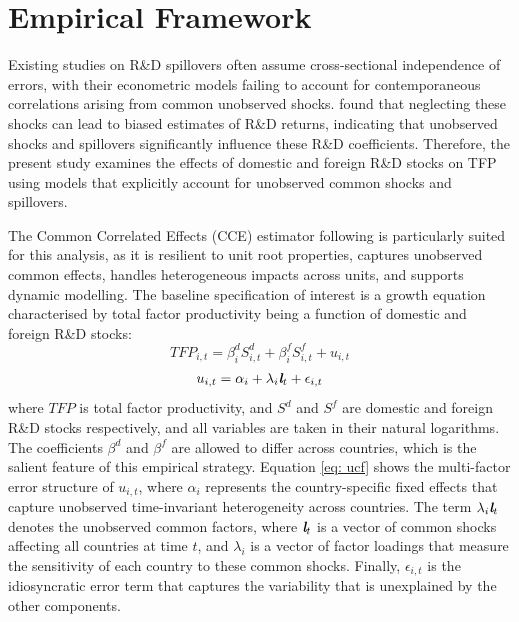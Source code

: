 \documentclass[12pt]{article}
\begin{document}
\section{Empirical Framework}

Existing studies on R\&D spillovers often assume cross-sectional independence of errors, with their econometric models failing to account for contemporaneous correlations arising from common unobserved shocks. \citet{Eberhardt2013} found that neglecting these shocks can lead to biased estimates of R\&D returns, indicating that unobserved shocks and spillovers significantly influence these R\&D coefficients. Therefore, the present study examines the effects of domestic and foreign R\&D stocks on TFP using models that explicitly account for unobserved common shocks and spillovers.

The Common Correlated Effects (CCE) estimator following \citet{Chudik2015} is particularly suited for this analysis, as it is resilient to unit root properties, captures unobserved common effects, handles heterogeneous impacts across units, and supports dynamic modelling. The baseline specification of interest is a growth equation characterised by total factor productivity being a function of domestic and foreign R\&D stocks:
\begin{equation}
TFP_{i,t}=\beta^d_i S_{i,t}^{d} + \beta^f_i S_{i,t}^{f} + u_{i,t}
\label{eq: ccemg}
\end{equation}
\begin{equation}
u_{i,t}=\alpha_i + \lambda_i \textit{\textbf{l}}_t + \epsilon_{i,t}
\label{eq: ucf}
\end{equation}
where $TFP$ is total factor productivity, and $S^d$ and $S^f$ are domestic and foreign R\&D stocks respectively, and all variables are taken in their natural logarithms. The coefficients $\beta^d$ and $\beta^f$ are allowed to differ across countries, which is the salient feature of this empirical strategy. Equation \ref{eq: ucf} shows the multi-factor error structure of $u_{i,t}$, where $\alpha_i$ represents the country-specific fixed effects that capture unobserved time-invariant heterogeneity across countries. The term $\lambda_i \textit{\textbf{l}}_t$ denotes the unobserved common factors, where $\textit{\textbf{l}}_t$ is a vector of common shocks affecting all countries at time $t$, and $\lambda_i$ is a vector of factor loadings that measure the sensitivity of each country to these common shocks. Finally, $\epsilon_{i,t}$ is the idiosyncratic error term that captures the variability that is unexplained by the other components. 
\end{document}
